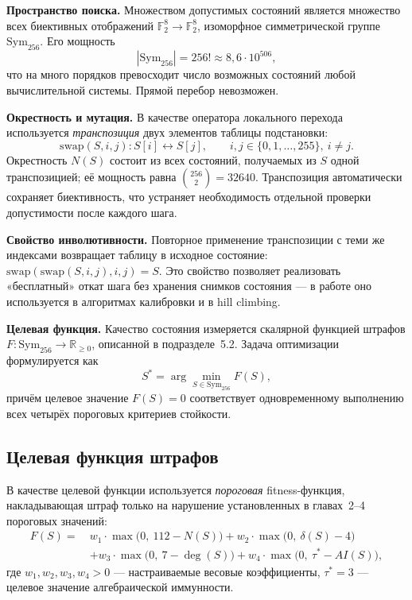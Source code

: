 \textbf{Пространство поиска.} Множеством допустимых состояний является
множество всех биективных отображений $\mathbb{F}_2^8 \to \mathbb{F}_2^8$,
изоморфное симметрической группе $\mathrm{Sym}_{256}$. Его мощность
\[
    |\mathrm{Sym}_{256}| = 256! \approx 8{,}6 \cdot 10^{506},
\]
что на много порядков превосходит число возможных состояний любой
вычислительной системы. Прямой перебор невозможен.

\textbf{Окрестность и мутация.} В качестве оператора локального
перехода используется \emph{транспозиция} двух элементов таблицы
подстановки:
\[
    \mathrm{swap}(S, i, j): S[i] \leftrightarrow S[j], \qquad i, j \in \{0, 1, \dots, 255\},\ i \neq j.
\]
Окрестность $N(S)$ состоит из всех состояний, получаемых из $S$
одной транспозицией; её мощность равна $\binom{256}{2} = 32640$.
Транспозиция автоматически сохраняет биективность, что устраняет
необходимость отдельной проверки допустимости после каждого шага.

\medskip
\textbf{Свойство инволютивности.} Повторное применение транспозиции
с теми же индексами возвращает таблицу в исходное состояние:
$\mathrm{swap}(\mathrm{swap}(S, i, j), i, j) = S$. Это свойство
позволяет реализовать «бесплатный» откат шага без хранения
снимков состояния — в работе оно используется в алгоритмах
калибровки и в hill climbing.

\textbf{Целевая функция.} Качество состояния измеряется скалярной
функцией штрафов $F: \mathrm{Sym}_{256} \to \mathbb{R}_{\geq 0}$,
описанной в подразделе~5.2. Задача оптимизации формулируется как
\[
    S^* = \arg\min_{S \in \mathrm{Sym}_{256}} F(S),
\]
причём целевое значение $F(S) = 0$ соответствует одновременному
выполнению всех четырёх пороговых критериев стойкости.

\subsection{Целевая функция штрафов}

В качестве целевой функции используется \emph{пороговая} fitness-функция,
накладывающая штраф только на нарушение установленных в главах~2–4
пороговых значений:
\begin{equation}
\label{eq:fitness}
\begin{aligned}
F(S) =\ &w_1 \cdot \max\bigl(0,\ 112 - N(S)\bigr) + w_2 \cdot \max\bigl(0,\ \delta(S) - 4\bigr) \\
       &+ w_3 \cdot \max\bigl(0,\ 7 - \deg(S)\bigr) + w_4 \cdot \max\bigl(0,\ \tau^* - AI(S)\bigr),
\end{aligned}
\end{equation}
где $w_1, w_2, w_3, w_4 > 0$ — настраиваемые весовые коэффициенты,
$\tau^* = 3$ — целевое значение алгебраической иммунности.

